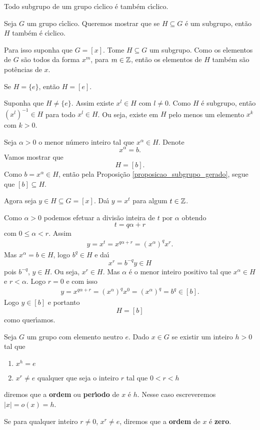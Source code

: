 \begin{proposicao}
    Todo subgrupo de um grupo c{\'\i}clico \'e tamb\'em c{\'\i}clico.
\end{proposicao}
\begin{prova}
	Seja $G$ um grupo c{\'\i}clico. Queremos mostrar que se $H \subseteq G$ \'e um subgrupo, ent\~ao $H$ tamb\'em \'e c{\'\i}clico.

	Para isso suponha que $G = [x]$. Tome $H \subseteq G$ um subgrupo. Como os elementos de $G$ s\~ao todos da forma $x^m$, para $m \in \mathbb{Z}$, ent\~ao os elementos de $H$ tamb\'em s\~ao pot\^encias de $x$.

	Se $H = \{e\}$, ent\~ao $H = [e]$.

	Suponha que $H \ne \{e\}$. Assim existe $x^l \in H$ com $l \ne 0$. Como $H$ \'e subgrupo, ent\~ao $(x^l)^{-1} \in H$ para todo $x^l \in H$. Ou seja, existe em $H$ pelo menos um elemento $x^k$ com $k > 0$.

	Seja $\alpha > 0$ o menor n\'umero inteiro tal que $x^\alpha \in H$. Denote
	\[
		x^\alpha = b.
	\]
	Vamos mostrar que
	\[
		H = [b].
	\]
	Como $b = x^\alpha \in H$, ent\~ao pela Proposi\c{c}\~ao \eqref{proposicao_subgrupo_gerado}, segue que $[b] \subseteq H$.

	Agora seja $y \in H \subseteq G = [x]$. Da{\'\i} $y = x^t$ para algum $t \in \mathbb{Z}$.

	Como $\alpha > 0$ podemos efetuar a divis\~ao inteira de $t$ por $\alpha$ obtendo
	\[
		t = q\alpha + r
	\]
	com $0 \le \alpha < r$. Assim
	\begin{align*}
		y = x^t = x^{q\alpha + r} = (x^{\alpha})^qx^r.
	\end{align*}
	Mas $x^\alpha = b \in H$, logo $b^q \in H$ e da{\'\i}
	\[
		x^r = b^{-q}y\in H
	\]
	pois $b^{-q}$, $y \in H$. Ou seja, $x^r \in H$. Mas $\alpha$ \'e o menor inteiro positivo tal que $x^\alpha \in H$ e $r < \alpha$. Logo $r = 0$ e com isso
	\begin{align*}
		y = x^{q\alpha + r} = (x^{\alpha})^qx^0 = (x^{\alpha})^q = b^q \in [b].
	\end{align*}
	Logo $y \in [b]$ e portanto
	\[
		H = [b]
	\]
	como quer{\'\i}amos.
\end{prova}

\begin{definicao}
    Seja $G$ um grupo com elemento neutro $e$. Dado $x \in G$ se existir um inteiro $h > 0$ tal que
    \begin{enumerate}[label={\roman*})]
        \item $x^h = e$
        \item $x^r \ne e$ qualquer que seja o inteiro $r$ tal que $0 < r < h$
    \end{enumerate}
    diremos que a \textbf{ordem} ou \textbf{per{\'\i}odo} de $x$ \'e $h$. Nesse caso escreveremos $|x| = o(x) = h$.

    Se para qualquer inteiro $r \ne 0$, $x^r \ne e$, diremos que a \textbf{ordem} de $x$ \'e \textbf{zero}.
\end{definicao}


